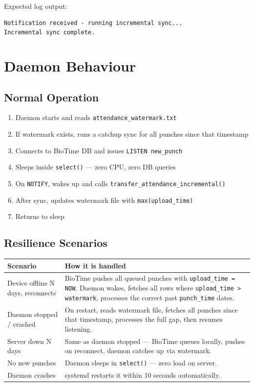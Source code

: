 \documentclass[12pt,a4paper]{article}
\begin{document}
Expected log output:
\begin{lstlisting}[style=bashstyle]
Notification received - running incremental sync...
Incremental sync complete.
\end{lstlisting}

\section{Daemon Behaviour}

\subsection{Normal Operation}

\begin{enumerate}[leftmargin=2em]
    \item Daemon starts and reads \texttt{attendance\_watermark.txt}
    \item If watermark exists, runs a catchup sync for all punches since
          that timestamp
    \item Connects to BioTime DB and issues \texttt{LISTEN new\_punch}
    \item Sleeps inside \texttt{select()} — zero CPU, zero DB queries
    \item On \texttt{NOTIFY}, wakes up and calls
          \texttt{transfer\_attendance\_incremental()}
    \item After sync, updates watermark file with \texttt{max(upload\_time)}
    \item Returns to sleep
\end{enumerate}

\subsection{Resilience Scenarios}

\begin{longtable}{p{4.5cm} p{9cm}}
\toprule
\textbf{Scenario} & \textbf{How it is handled} \\
\midrule
\endhead
Device offline N days, reconnects
    & BioTime pushes all queued punches with \texttt{upload\_time = NOW}.
      Daemon wakes, fetches all rows where \texttt{upload\_time > watermark},
      processes the correct past \texttt{punch\_time} dates. \\[6pt]
Daemon stopped / crashed
    & On restart, reads watermark file, fetches all punches since that
      timestamp, processes the full gap, then resumes listening. \\[6pt]
Server down N days
    & Same as daemon stopped — BioTime queues locally, pushes on reconnect,
      daemon catches up via watermark. \\[6pt]
No new punches
    & Daemon sleeps in \texttt{select()} — zero load on server. \\[6pt]
Daemon crashes
    & systemd restarts it within 10 seconds automatically. \\
\bottomrule
\end{longtable}
\end{document}
